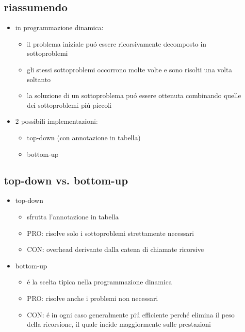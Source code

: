 \subsection*{riassumendo}
\begin{flushleft}
	\begin{itemize}
		\item in programmazione dinamica:
		\begin{itemize}
			\item il problema iniziale pu\'o essere ricorsivamente decomposto in sottoproblemi
			\item gli stessi sottoproblemi occorrono molte volte e sono risolti una volta soltanto
			\item la soluzione di un sottoproblema pu\'o essere ottenuta combinando quelle dei sottoproblemi pi\'u piccoli
		\end{itemize}
		\item 2 possibili implementazioni:
		\begin{itemize}
			\item top-down (con annotazione in tabella)
			\item bottom-up
		\end{itemize}
	\end{itemize}
\end{flushleft}


\subsection*{top-down vs. bottom-up}
\begin{flushleft}
	\begin{itemize}
		\item top-down
		\begin{itemize}
			\item sfrutta l'annotazione in tabella
			\item PRO: risolve solo i sottoproblemi strettamente necessari
			\item CON: overhead derivante dalla catena di chiamate ricorsive
		\end{itemize}
		\item bottom-up
		\begin{itemize}
			\item \'e la scelta tipica nella programmazione dinamica
			\item PRO: risolve anche i problemi non necessari
			\item CON: \'e in ogni caso generalmente pi\'u efficiente perch\'e elimina il peso della ricorsione, il quale incide maggiormente sulle prestazioni
		\end{itemize}
	\end{itemize}
\end{flushleft}

